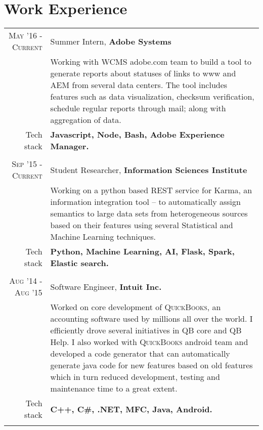 \section{Work Experience}
\renewcommand{\arraystretch}{0.85}%
\begin{tabular}{r|p{13cm}}
\textsc{May '16 - Current} & Summer Intern, \textbf{Adobe Systems} \\
& \small{Working with WCMS adobe.com team to build a tool to generate reports about statuses of links to www and AEM from several data centers. The tool includes features such as data visualization, checksum verification, schedule regular reports through mail; along with aggregation of data.}\\
\small{Tech stack} &\footnotesize{\textbf{Javascript, Node, Bash, Adobe Experience Manager.}} \\
\multicolumn{2}{c}{} \\

\textsc{Sep '15 - Current} & Student Researcher, \textbf{Information Sciences Institute} \\
& \small{Working on a python based REST service for Karma, an information integration tool – to automatically assign semantics to large data sets from heterogeneous sources based on their features using several Statistical and Machine Learning techniques.}\\
\small{Tech stack} &\footnotesize{\textbf{Python, Machine Learning, AI, Flask, Spark, Elastic search.}} \\
\multicolumn{2}{c}{} \\

\textsc{Aug '14 - Aug '15 } & Software Engineer, \textbf{Intuit Inc.} \\
& \small{Worked on core development of \textsc{QuickBooks}, an accounting software used by millions all over the world. I efficiently drove several initiatives in QB core and QB Help. I also worked with \textsc{QuickBooks} android team and developed a code generator that can automatically generate java code for new features based on old features which in turn reduced development, testing and maintenance time to a great extent.}\\
\small{Tech stack} &\footnotesize{\textbf{C++, C\#, .NET, MFC, Java, Android.}} \\
\multicolumn{2}{c}{}



\end{tabular}
